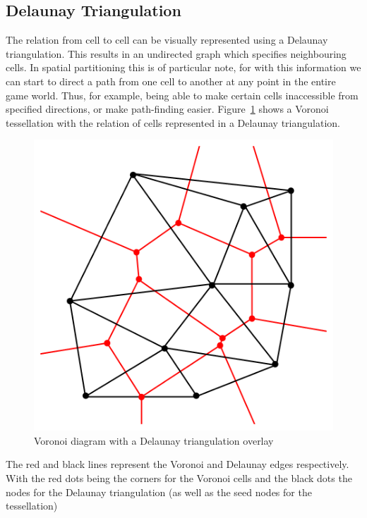 \documentclass[11pt,a4paper,twocolumn]{article}
\begin{document}
\subsection{Delaunay Triangulation}
The relation from cell to cell can be visually represented using a Delaunay triangulation. This results in an undirected graph which specifies neighbouring cells. In spatial partitioning this is of particular note, for with this information we can start to direct a path from one cell to another at any point in the entire game world. Thus, for example, being able to make certain cells inaccessible from specified directions, or make path-finding easier. Figure~\ref{fig:voronoidelaunay} shows a Voronoi tessellation with the relation of cells represented in a Delaunay triangulation. 
\begin{figure}[b]{}
\centering
	\includegraphics[scale=0.25]{images/Delaunay_Voronoi}
	\caption{Voronoi diagram with a Delaunay triangulation overlay \cite{delaunaywiki}} 
\label{fig:voronoidelaunay}
\end{figure}
The red and black lines represent the Voronoi and Delaunay edges respectively. With the red dots being the corners for the Voronoi cells and the black dots the nodes for the Delaunay triangulation {(as well as the seed nodes for the tessellation)}
\end{document}
